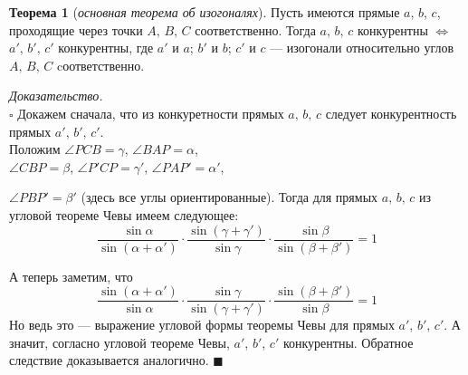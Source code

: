 \documentclass[14pt]{extarticle}
\theoremstyle{definition}
\theoremstyle{theorem}
\newtheorem*{theorem}{Теорема}
\renewenvironment{proof}
    {\noindent \textit{Доказательство.}\\
	\indent $\square$}
	{ $\blacksquare$\\ }
\begin{document}
\begin{theorem}[\textit{основная теорема об изогоналях}]
Пусть имеются прямые \(a\), \(b\), \(c\), проходящие через точки \(A,\, B,
\, C\) соответственно. Тогда \(a, \, b, \, c\)  конкурентны \(\iff\)
\(a', \, b', \, c'\) конкурентны, 
где \(a'\) и \(a\); \(b'\) и \(b\); \(c'\) и \(c\) --- изогонали
относительно углов \(A,\, B, \, C\) cоответственно.
\end{theorem}


\begin{proof}
Докажем сначала, что из конкуретности прямых \(a, \, b, \, c\)
следует конкурентность прямых \(a', \, b', \, c'\).\\
Положим \(\angle PCB = \gamma\), \( \angle BAP = \alpha\), \\
\(\angle CBP = \beta\), \(\angle P'CP = \gamma'\), \(\angle PAP' = \alpha'\), \par
\begin{figure}
    \vspace{-2cm}
\end{figure}
\noindent\(\angle PBP' = \beta'\) (здесь все углы
ориентированные). Тогда для прямых  \(a, \, b, \, c\) из угловой теореме
Чевы имеем следующее:
\[
\frac{\sin \alpha}{\sin(\alpha + \alpha ')} \cdot
\frac{\sin(\gamma + \gamma ')}{\sin \gamma} \cdot
\frac{\sin \beta}{\sin(\beta + \beta ')} 
 = 1
\]

\noindent А теперь заметим, что 
\[
\frac{\sin(\alpha + \alpha ')}{\sin \alpha} \cdot
\frac{\sin \gamma}{\sin(\gamma + \gamma ')} \cdot
\frac{\sin(\beta + \beta ')}{\sin \beta} 
 = 1
\]
Но ведь это --- выражение угловой формы теоремы Чевы для прямых
\(a'\), \(b'\), \(c'\). А значит, согласно угловой теореме Чевы, 
\(a'\), \(b'\), \(c'\) конкурентны.
Обратное следствие доказывается аналогично. 
\end{proof} \vspace{-4mm} 
\end{document}
